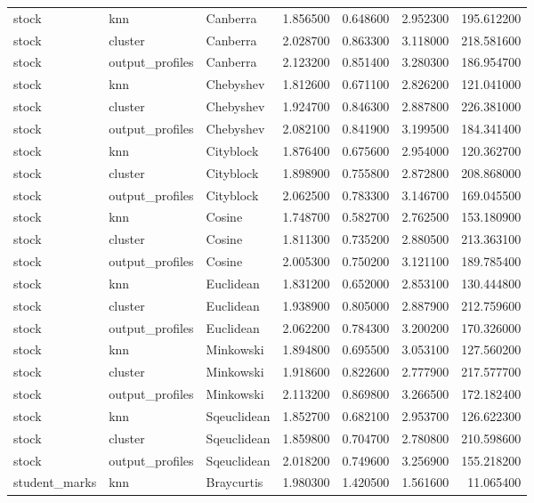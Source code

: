 \begin{tabular}{lllrrrr}
stock & knn & Canberra & 1.856500 & 0.648600 & 2.952300 & 195.612200 \\
stock & cluster & Canberra & 2.028700 & 0.863300 & 3.118000 & 218.581600 \\
stock & output\_profiles & Canberra & 2.123200 & 0.851400 & 3.280300 & 186.954700 \\
stock & knn & Chebyshev & 1.812600 & 0.671100 & 2.826200 & 121.041000 \\
stock & cluster & Chebyshev & 1.924700 & 0.846300 & 2.887800 & 226.381000 \\
stock & output\_profiles & Chebyshev & 2.082100 & 0.841900 & 3.199500 & 184.341400 \\
stock & knn & Cityblock & 1.876400 & 0.675600 & 2.954000 & 120.362700 \\
stock & cluster & Cityblock & 1.898900 & 0.755800 & 2.872800 & 208.868000 \\
stock & output\_profiles & Cityblock & 2.062500 & 0.783300 & 3.146700 & 169.045500 \\
stock & knn & Cosine & 1.748700 & 0.582700 & 2.762500 & 153.180900 \\
stock & cluster & Cosine & 1.811300 & 0.735200 & 2.880500 & 213.363100 \\
stock & output\_profiles & Cosine & 2.005300 & 0.750200 & 3.121100 & 189.785400 \\
stock & knn & Euclidean & 1.831200 & 0.652000 & 2.853100 & 130.444800 \\
stock & cluster & Euclidean & 1.938900 & 0.805000 & 2.887900 & 212.759600 \\
stock & output\_profiles & Euclidean & 2.062200 & 0.784300 & 3.200200 & 170.326000 \\
stock & knn & Minkowski & 1.894800 & 0.695500 & 3.053100 & 127.560200 \\
stock & cluster & Minkowski & 1.918600 & 0.822600 & 2.777900 & 217.577700 \\
stock & output\_profiles & Minkowski & 2.113200 & 0.869800 & 3.266500 & 172.182400 \\
stock & knn & Sqeuclidean & 1.852700 & 0.682100 & 2.953700 & 126.622300 \\
stock & cluster & Sqeuclidean & 1.859800 & 0.704700 & 2.780800 & 210.598600 \\
stock & output\_profiles & Sqeuclidean & 2.018200 & 0.749600 & 3.256900 & 155.218200 \\
student\_marks & knn & Braycurtis & 1.980300 & 1.420500 & 1.561600 & 11.065400 \\

\end{tabular}
